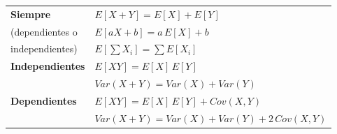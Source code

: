 \begin{center}
\renewcommand{\arraystretch}{1.5}\setlength{\tabcolsep}{10pt}
\begin{tabular}{ll}
	\textbf{Siempre} & $E[X + Y] = E[X] + E[Y]$ \\
	(dependientes o & $E[aX + b] = a\,E[X] + b$ \\
	independientes) & $E\left[\sum X_i\right] = \sum E[X_i]$ \\
	\hline
	\textbf{Independientes} & $E[XY] = E[X]\,E[Y]$ \\
	 & $Var(X + Y) = Var(X) + Var(Y)$ \\
	\hline
	\textbf{Dependientes} & $E[XY] = E[X]\,E[Y] + Cov(X, Y)$ \\
	 & $Var(X + Y) = Var(X) + Var(Y) + 2\,Cov(X, Y)$ \\
\end{tabular}
\end{center}
